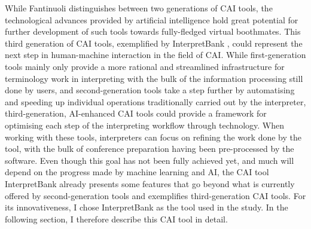 While Fantinuoli distinguishes between two generations of CAI tools, the technological advances provided by artificial intelligence hold great potential for further development of such tools towards fully-fledged virtual boothmates. This third generation of CAI tools, exemplified by InterpretBank \citep{fantinuoli_interpretbank_2012, fantinuoli_computer-assisted_2017}, could represent the next step in human-machine interaction in the field of CAI. While first-generation tools mainly only provide a more rational and streamlined infrastructure for terminology work in interpreting with the bulk of the information processing still done by users, and second-generation tools take a step further by automatising and speeding up individual operations traditionally carried out by the interpreter, third-generation, AI-enhanced CAI tools could provide a framework for optimising each step of the interpreting workflow through technology. When working with these tools, interpreters can focus on refining the work done by the tool, with the bulk of conference preparation having been pre-processed by the software. Even though this goal has not been fully achieved yet, and much will depend on the progress made by machine learning and AI, the CAI tool InterpretBank already presents some features that go beyond what is currently offered by second-generation tools and exemplifies third-generation CAI tools. For its innovativeness, I chose InterpretBank as the tool used in the study. In the following section, I therefore describe this CAI tool in detail.

